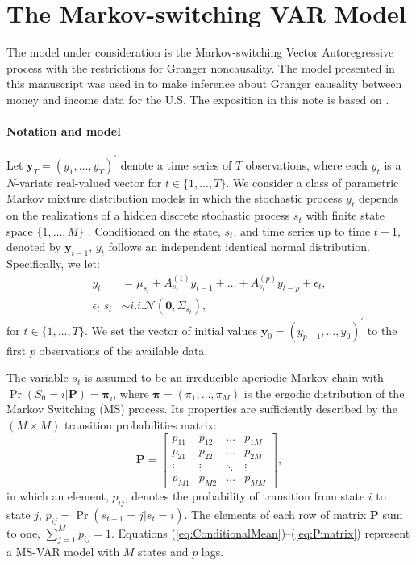 \documentclass[final,3p,authoryear]{elsarticle}
\begin{document}
\section{The Markov-switching VAR Model}\label{sec:Model} 


\noindent
The model under consideration is the Markov-switching Vector Autoregressive process with the restrictions for Granger noncausality. The model presented in this manuscript was used in \cite{Droumaguet2016} to make inference about Granger causality between money and income data for the U.S. The exposition in this note is based on \cite{Droumaguet2016online}. 

\paragraph{Notation and model} Let $\mathbf{y}_T = (y_1,\dots,y_T)^{'}$ denote a time series of $T$ observations, where each $y_{t}$ is a $N$-variate real-valued vector for $t \in \{1,\dots,T\}$. We consider a class of parametric Markov mixture distribution models in which the stochastic process $y_t$ depends on the realizations of a hidden discrete stochastic process $s_t$ with finite state space $\{ 1,\dots,M \}$ \citep[see][]{Hamilton:1989zl}. Conditioned on the state, $s_t$, and time series up to time $t-1$, denoted by $\mathbf{y}_{t-1}$, $y_t$ follows an independent identical normal distribution. Specifically, we let:
\begin{align}
  y_t &= \mu_{s_t} + A_{s_t}^{(1)} y_{t-1} + \dots + A_{s_t}^{(p)} y_{t-p} + \epsilon_t, \label{eq:ConditionalMean}\\
 \epsilon_t | s_t &\sim i.i.\mathcal{N}(\mathbf{0}, \Sigma_{s_t}),  \label{eq:epsilon1}
\end{align} 
for $t\in\{1,\dots,T\}$. We set the vector of initial values $\mathbf{y}_0 = (y_{p-1}, \dots, y_0)^{\prime}$ to the first $p$ observations of the available data.


The variable $s_t$ is assumed to be an irreducible aperiodic Markov chain with $\Pr(S_0 = i|\mathbf{P}) = \mathbf{\pi}_i$, where $\mathbf{\pi} = (\pi_1,\dots,\pi_M)$ is the ergodic distribution of the Markov Switching (MS) process. Its properties are sufficiently described by the $(M\times M)$ transition probabilities matrix:
\begin{equation}\label{eq:Pmatrix}
  \mathbf{P} = \begin{bmatrix} p_{11} & p_{12} & \dots & p_{1M} \\ p_{21} & p_{22} & \dots & p_{2M} \\ \vdots & \vdots & \ddots & \vdots \\ p_{M1} & p_{M2} & \dots & p_{MM} \end{bmatrix},
\end{equation} 
in which an element, $p_{ij}$, denotes the probability of transition from state $i$ to state $j$, $ p_{ij} = \Pr(s_{t+1} = j| s_{t} = i) $. The elements of each row of matrix $\mathbf{P}$ sum to one, $ \sum_{j=1}^{M} p_{ij} = 1 $. Equations (\ref{eq:ConditionalMean})--(\ref{eq:Pmatrix}) represent a MS-VAR model with $M$ states and $p$ lags.
\end{document}
